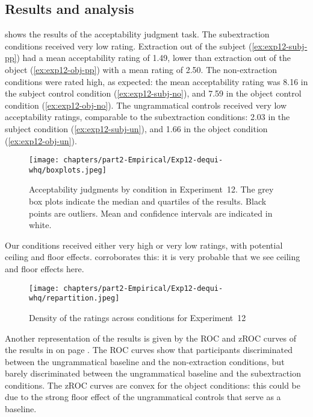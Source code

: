 \subsection{Results and analysis}

 shows the results of the acceptability judgment task.
The subextraction conditions received very low rating. Extraction out of the subject (\ref{ex:exp12-subj-pp}) had a mean acceptability rating of 1.49, lower than extraction out of the object (\ref{ex:exp12-obj-pp}) with a mean rating of 2.50. The non-extraction conditions were rated high, as expected: the mean acceptability rating was 8.16 in the subject control condition (\ref{ex:exp12-subj-no}), and 7.59 in the object control condition (\ref{ex:exp12-obj-no}). The ungrammatical controls received very low acceptability ratings, comparable to the subextraction conditions: 2.03 in the subject condition (\ref{ex:exp12-subj-un}), and 1.66 in the object condition (\ref{ex:exp12-obj-un}). 

\begin{figure}
    \centering
    \texttt{[image: chapters/part2-Empirical/Exp12-dequi-whq/boxplots.jpeg]}
    \caption{Acceptability judgments by condition in Experiment~12. The grey box plots indicate the median and quartiles of the results. Black points are outliers. Mean and confidence intervals are indicated in white.}
    \label{fig:exp12-boxplot}
\end{figure}

Our conditions received either very high or very low ratings, with potential ceiling and floor effects.  corroborates this: it is very probable that we see ceiling and floor effects here.

\begin{figure}
    \centering
    \texttt{[image: chapters/part2-Empirical/Exp12-dequi-whq/repartition.jpeg]}
    \caption{Density of the ratings across conditions for Experiment~12}
    \label{fig:exp12-repartition}
\end{figure}

Another representation of the results is given by the ROC and zROC curves of the results in  on page \pageref{fig:exp12-ROC}. The ROC curves show that participants discriminated between the ungrammatical baseline and the non-extraction conditions, but barely discriminated between the ungrammatical baseline and the subextraction conditions. The zROC curves are convex for the object conditions: this could be due to the strong floor effect of the ungrammatical controls that serve as a baseline. 

